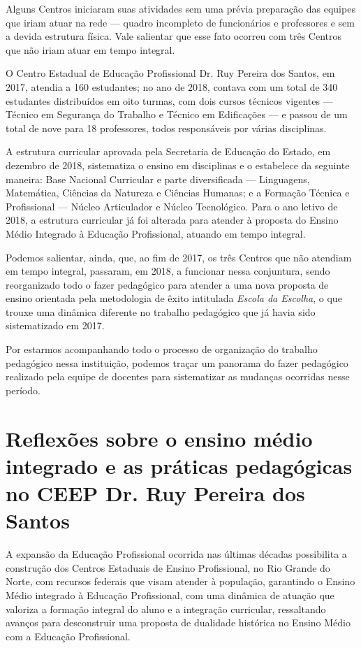 \begin{refsection}
    Alguns Centros iniciaram suas atividades sem uma prévia preparação das equipes que iriam atuar na rede --- quadro incompleto de funcionários e professores e sem a devida estrutura física. Vale salientar que esse fato ocorreu com três Centros que não iriam atuar em tempo integral. 

    O Centro Estadual de Educação Profissional Dr. Ruy Pereira dos Santos, em 2017, atendia a 160 estudantes; no ano de 2018, contava com um total de 340 estudantes distribuídos em oito turmas, com dois cursos técnicos vigentes --- Técnico em Segurança do Trabalho e Técnico em Edificações --- e passou de um total de nove para 18 professores, todos responsáveis por várias disciplinas. 

    A estrutura curricular aprovada pela Secretaria de Educação do Estado, em dezembro de 2018, sistematiza o ensino em disciplinas e o estabelece da seguinte maneira: Base Nacional Curricular e parte diversificada --- Linguagens, Matemática, Ciências da Natureza e Ciências Humanas; e a Formação Técnica e Profissional --- Núcleo Articulador e Núcleo Tecnológico. Para o ano letivo de 2018, a estrutura curricular já foi alterada para atender à proposta do Ensino Médio Integrado à Educação Profissional, atuando em tempo integral.  

    Podemos salientar, ainda, que, ao fim de 2017, os três Centros que não atendiam em tempo integral, passaram, em 2018, a funcionar nessa conjuntura, sendo reorganizado todo o fazer pedagógico para atender a uma nova proposta de ensino orientada pela metodologia de êxito intitulada \textit{Escola da Escolha}, o que trouxe uma dinâmica diferente no trabalho pedagógico que já havia sido sistematizado em 2017. 

    Por estarmos acompanhando todo o processo de organização do trabalho pedagógico nessa instituição, podemos traçar um panorama do fazer pedagógico realizado pela equipe de docentes para sistematizar as mudanças ocorridas nesse período.  

    \section{Reflexões sobre o ensino médio integrado e as práticas pedagógicas no CEEP Dr. Ruy Pereira dos Santos}

    A expansão da Educação Profissional ocorrida nas últimas décadas possibilita a construção dos Centros Estaduais de Ensino Profissional, no Rio Grande do Norte, com recursos federais que visam atender à população, garantindo o Ensino Médio integrado à Educação Profissional, com uma dinâmica de atuação que valoriza a formação integral do aluno e a integração curricular, ressaltando avanços para desconstruir uma proposta de dualidade histórica no Ensino Médio com a Educação Profissional. 


\end{refsection}
